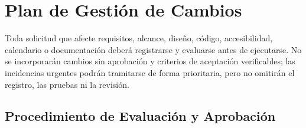 \newpage
\section{Plan de Gestión de Cambios}

Toda solicitud que afecte requisitos, alcance, diseño, código, accesibilidad, calendario o documentación deberá registrarse y evaluarse antes de ejecutarse. No se incorporarán cambios sin aprobación y criterios de aceptación verificables; las incidencias urgentes podrán tramitarse de forma prioritaria, pero no omitirán el registro, las pruebas ni la revisión.

\subsection{Procedimiento de Evaluación y Aprobación}
